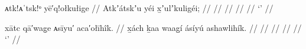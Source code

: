 
\ex\label{ex:94-13-}%
%
\begingl
	\glpreamble	ᴀtk!ᴀˈtsk!ᵒ yē′q!ołkułige //
	\glpreamble	Atkʼátskʼu yéi x̱ʼulʼkuligéi;  //
	\gla	 //
	\glb	 //
	\glc	 //
	\gld	 //
	\glft	‘’
		//
\endgl
\xe

\ex\label{ex:94-14-}%
%
\begingl
	\glpreamble	xātc qā′wag̣e ᴀsīyu′ aca′ołīhîk. //
	\glpreamble	x̱ách ḵaa waag̱í ásíyú ashawlihík. //
	\gla	 //
	\glb	 //
	\glc	 //
	\gld	 //
	\glft	‘’
		//
\endgl
\xe